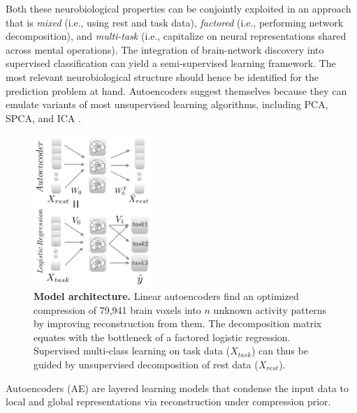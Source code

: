 \documentclass{article} %
\begin{document}
Both these neurobiological properties can be conjointly exploited in an
approach that is
\textit{mixed} (i.e., using rest and task data),
\textit{factored} (i.e., performing network decomposition), and
\textit{multi-task} (i.e., capitalize on neural representations shared across
mental operations).
%
The integration of brain-network discovery into
supervised classification can yield a semi-supervised learning
framework. The most relevant
neurobiological structure should hence be identified
for the prediction problem at hand.
%
Autoencoders suggest themselves because they can emulate
variants of most unsupervised learning algorithms,
including PCA, SPCA, and ICA \cite{hinton06}.
\begin{figure}
  \centering
    \includegraphics[width=0.40\textwidth]{figures/figure1.png}
  \vspace{-0.7cm}
  \caption {\textbf{Model architecture.}
  Linear autoencoders find an optimized compression of 79,941 brain voxels
  into $n$ unknown activity patterns by improving reconstruction from them.
  The decomposition matrix equates with the bottleneck of
  a factored logistic regression.
  Supervised multi-class learning on task data ($X_{task}$)
  can thus be guided by
  unsupervised decomposition of rest data ($X_{rest}$).
  }
\end{figure}
%
Autoencoders (AE)
are layered learning models
that condense the input data to
local and global 
representations
via reconstruction under compression prior.
%
\end{document}
